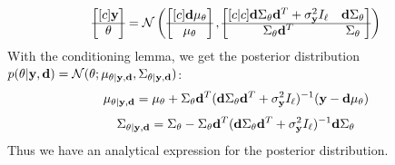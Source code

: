 \begin{equation}
  \begin{bmatrix}[c]
    \mathbf{y}\\
    \hline
    \theta 
  \end{bmatrix}
  =
  \mathcal{N}\left(
    \begin{bmatrix}[c]
      \mathbf{d}\mu_\theta\\
      \hline
      \mu_\theta
    \end{bmatrix},
    \begin{bmatrix}[c | c]
      \mathbf{d}\Sigma_{\mathbf{\theta}}\mathbf{d}^T + \sigma^2_{\mathbf{y}} I_\ell &     \mathbf{d}\Sigma_{\mathbf{\theta}} \\ 
      \hline
      \Sigma_{\mathbf{\theta}}\mathbf{d}^T & \Sigma_{\mathbf{\theta}}
    \end{bmatrix}
  \right)
\end{equation}
With the conditioning lemma, we get the posterior distribution $p(\theta | \mathbf{y}, \mathbf{d}) = \mathcal{N}(\theta; \mu_{\theta| \mathbf{y}, \mathbf{d}}, \Sigma_{\theta | \mathbf{y}, \mathbf{d}})$:
\begin{equation}
  \label{eq:posterior-mean}
  \mu_{\theta | \mathbf{y}, \mathbf{d}} = \mu_\theta + \Sigma_\theta \mathbf{d}^T (\mathbf{d} \Sigma_\theta \mathbf{d}^T + \sigma^2_{\mathbf{y}} I_\ell)^{-1}(\mathbf{y} - \mathbf{d}\mu_\theta)
\end{equation}
\begin{equation}
  \label{eq:posterior-cov}
  \Sigma_{\theta | \mathbf{y}, \mathbf{d}} = \Sigma_\theta - \Sigma_\theta \mathbf{d}^T (\mathbf{d} \Sigma_\theta \mathbf{d}^T + \sigma^2_{\mathbf{y}} I_\ell)^{-1}\mathbf{d}\Sigma_\theta
\end{equation}
Thus we have an analytical expression for the posterior distribution.
